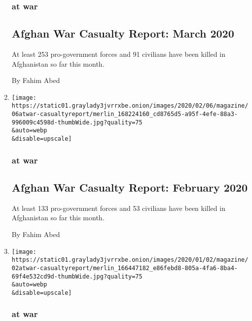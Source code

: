 \begin{enumerate}
  \hypertarget{at-war-6}{%
  \subsubsection{at war}\label{at-war-6}}

  \hypertarget{afghan-war-casualty-report-march-2020}{%
  \subsection{Afghan War Casualty Report: March
  2020}\label{afghan-war-casualty-report-march-2020}}

  At least 253 pro-government forces and 91 civilians have been killed
  in Afghanistan so far this month.

  By Fahim Abed
\item
  \href{/2020/02/06/magazine/afghan-war-casualty-report-february-2020.html}{}

  \texttt{[image: https://static01.graylady3jvrrxbe.onion/images/2020/02/06/magazine/06atwar-casualtyreport/merlin\_168224160\_cd8765d5-a95f-4efe-88a3-996009c4598d-thumbWide.jpg?quality=75\\\&auto=webp\\\&disable=upscale]}

  \hypertarget{at-war-7}{%
  \subsubsection{at war}\label{at-war-7}}

  \hypertarget{afghan-war-casualty-report-february-2020}{%
  \subsection{Afghan War Casualty Report: February
  2020}\label{afghan-war-casualty-report-february-2020}}

  At least 133 pro-government forces and 53 civilians have been killed
  in Afghanistan so far this month.

  By Fahim Abed
\item
  \href{/2020/01/02/magazine/afghan-war-casualty-report-january-2020.html}{}

  \texttt{[image: https://static01.graylady3jvrrxbe.onion/images/2020/01/02/magazine/02atwar-casualtyreport/merlin\_166447182\_e86febd8-805a-4fa6-8ba4-69f4e532cd9d-thumbWide.jpg?quality=75\\\&auto=webp\\\&disable=upscale]}

  \hypertarget{at-war-8}{%
  \subsubsection{at war}\label{at-war-8}}


\end{enumerate}
